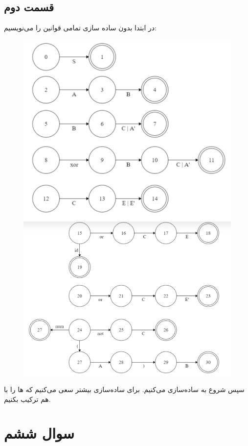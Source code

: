 \documentclass[]{article}
\begin{document}
\subsection*{قسمت دوم}
در ابتدا بدون ساده سازی تمامی قوانین را می‌نویسیم:
\begin{figure}[H]
    \centering
    \includegraphics[scale=0.5]{figure/5-2-part1.png}
    \includegraphics[scale=0.5]{figure/5-2-part2.png}
\end{figure}
سپس شروع به ساده‌سازی می‌کنیم. برای ساده‌سازی بیشتر سعی می‌کنیم که
ها
را با هم ترکیب بکنیم.
\section*{سوال ششم}
\end{document}
